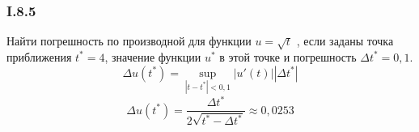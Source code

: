 \subsubsection*{I.8.5}
Найти погрешность по производной для функции $u=\sqrt{t}$ , если заданы точка приближения $t^* = 4$, значение функции $u^*$ в этой точке и погрешность $\Delta t^* = 0,1$.\\
$$\Delta u(t^*) = \sup\limits_{|t - t^*| < 0,1}|u'(t)||\Delta t^*|$$
$$\Delta u(t^*) = \frac{\Delta t^*}{2 \sqrt{t^* - \Delta t^*}} \approx 0,0253$$